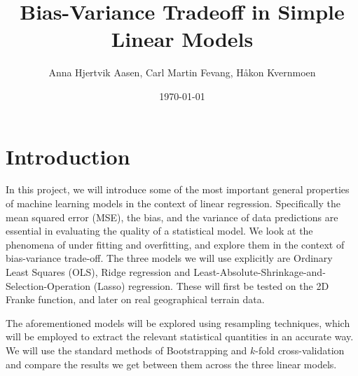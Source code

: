 \documentclass[twocolumn,english,notitlepage]{article}
\title{Bias-Variance Tradeoff in Simple Linear Models}
\author{Anna Hjertvik Aasen, Carl Martin Fevang, Håkon Kvernmoen}
\date{\today}
\begin{document}


\section{Introduction}
    In this project, we will introduce some of the most important general properties of machine learning models in the context of linear regression. Specifically the mean squared error (MSE), the bias, and the variance of data predictions are essential in evaluating the quality of a statistical model. We look at the phenomena of under fitting and overfitting, and explore them in the context of bias-variance trade-off. The three models we will use explicitly are Ordinary Least Squares (OLS), Ridge regression and Least-Absolute-Shrinkage-and-Selection-Operation (Lasso) regression. These will first be tested on the 2D Franke function, and later on real geographical terrain data.

    The aforementioned models will be explored using resampling techniques, which will be employed to extract the relevant statistical quantities in an accurate way. We will use the standard methods of Bootstrapping and $k$-fold cross-validation and compare the results we get between them across the three linear models.
\end{document}
